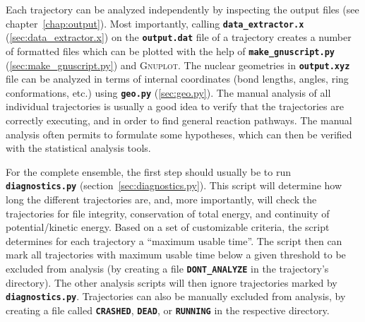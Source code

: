 \documentclass[a4paper,10pt,DIV=15,openany]{scrbook}
\newcommand{\ttt}[1]{\textbf{\texttt{#1}}}
\begin{document}
Each trajectory can be analyzed independently by inspecting the output files (see chapter~\ref{chap:output}). Most importantly, calling \ttt{data\_extractor.x} (\ref{sec:data_extractor.x}) on the \ttt{output.dat} file of a trajectory creates a number of formatted files which can be plotted with the help of \ttt{make\_gnuscript.py} (\ref{sec:make_gnuscript.py}) and \textsc{Gnuplot}.
The nuclear geometries in \ttt{output.xyz} file can be analyzed in terms of internal coordinates (bond lengths, angles, ring conformations, etc.) using \ttt{geo.py} (\ref{sec:geo.py}).
The manual analysis of all individual trajectories is usually a good idea to verify that the trajectories are correctly executing, and in order to find general reaction pathways.
The manual analysis often permits to formulate some hypotheses, which can then be verified with the statistical analysis tools.

For the complete ensemble, the first step should usually be to run \ttt{diagnostics.py} (section~\ref{sec:diagnostics.py}).
This script will determine how long the different trajectories are, and, more importantly, will check the trajectories for file integrity, conservation of total energy, and continuity of potential/kinetic energy.
Based on a set of customizable criteria, the script determines for each trajectory a ``maximum usable time''.
The script then can mark all trajectories with maximum usable time below a given threshold to be excluded from analysis (by creating a file \ttt{DONT\_ANALYZE} in the trajectory's directory).
The other analysis scripts will then ignore trajectories marked by \ttt{diagnostics.py}.
Trajectories can also be manually excluded from analysis, by creating a file called \ttt{CRASHED}, \ttt{DEAD}, or \ttt{RUNNING} in the respective directory.
\end{document}

